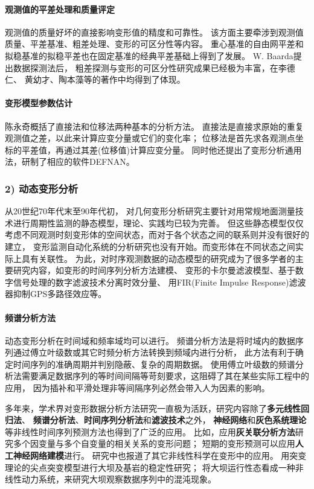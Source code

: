 \paragraph*{观测值的平差处理和质量评定}
观测值的质量好坏的直接影响变形值的精度和可靠性。
该方面主要牵涉到观测值质量、平差基准、粗差处理、变形的可区分性等内容。
重心基准的自由网平差和拟稳基准的拟稳平差也在固定基准的经典平差基础上得到了发展。
W. Baarda提出数据探测法后，
粗差探测与变形的可区分性研究成果已经极为丰富，在李德仁、
黄幼才、陶本藻等的著作中均得到了体现。
\paragraph*{变形模型参数估计}
陈永奇概括了直接法和位移法两种基本的分析方法。
直接法是直接求原始的重复观测值之差，以此来计算应变分量或它们的变化率；
位移法是首先求各观测点坐标的平差值，再通过其差(位移值)计算应变分量。
同时他还提出了变形分析通用法，研制了相应的软件DEFNAN。

\subsubsection*{2) 动态变形分析}
从20世纪70年代末至90年代初，
对几何变形分析研究主要针对用常规地面测量技术进行周期性监测的静态模型，理论、实践均已较为完善。
但这些静态模型仅仅考虑不同观测时刻变形体的空间状态，而对于各个状态之间的联系则并没有很好的建立，
变形监测自动化系统的分析研究也没有开始。而变形体在不同状态之间实际上具有关联性。
为此，对时序观测数据的动态模型的研究成为了很多学者的主要研究内容，如变形的时间序列分析方法建模、
变形的卡尔曼滤波模型、基于数字信号处理的数字滤波技术分离时效分量、
用FIR(Finite Impulse Response)滤波器抑制GPS多路径效应等。
\paragraph*{频谱分析方法}
动态变形分析在时间域和频率域均可以进行。
频谱分析方法是将时域内的数据序列通过傅立叶级数或其它时频分析方法转换到频域内进行分析，
此方法有利于确定时间序列的准确周期并判别隐蔽、复杂的周期数据。
使用傅立叶级数的频谱分析法需要满足数据序列的等时间间隔等苛刻要求，这阻碍了其在某些实际工程中的应用，
因为插补和平滑处理非等间隔序列必然会带入人为因素的影响。

多年来，学术界对变形数据分析方法研究一直极为活跃，研究内容除了\textbf{多元线性回归法}、
\textbf{频谱分析法}、\textbf{时间序列分析法}和\textbf{滤波技术}之外，
\textbf{神经网络}和\textbf{灰色系统理论}等非线性时间序列预测方法也得到了广泛的应用。
比如，应用\textbf{灰关联分析方法}研究多个因变量与多个自变量的相关关系的变形问题；
短期的变形预测可以应用\textbf{人工神经网络建模}进行。
研究中也报道了其它非线性科学在变形中的应用。
用突变理论的尖点突变模型进行大坝及基岩的稳定性研究；
将大坝运行性态看成一种非线性动力系统，来研究大坝观察数据序列中的混沌现象。


